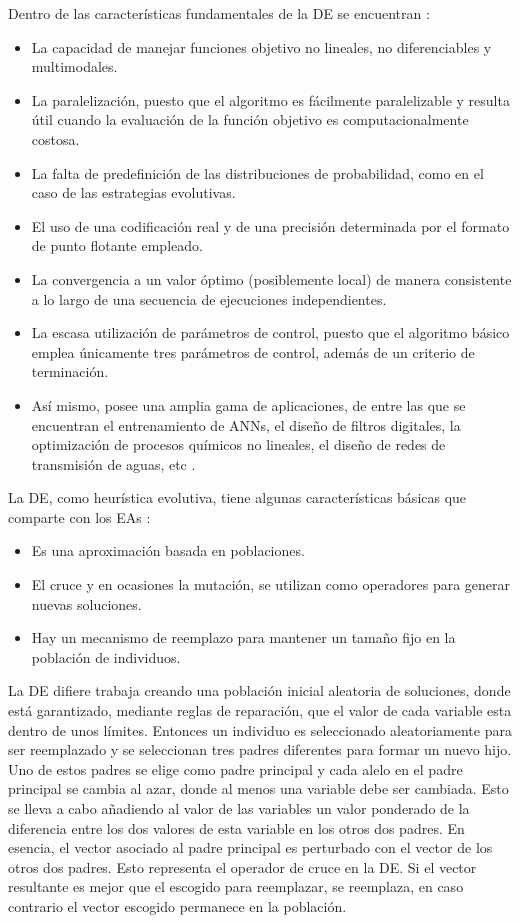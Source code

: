 Dentro de las características fundamentales de la DE se encuentran \cite{Storn1997}:
\begin{itemize}
\item La capacidad de manejar funciones objetivo no lineales, no diferenciables y
multimodales.
\item La paralelización,  puesto  que el algoritmo es fácilmente  paralelizable y resulta
útil  cuando la evaluación de la función objetivo es computacionalmente costosa.
\item La  falta  de  predefinición  de  las  distribuciones  de  probabilidad,  como  en
el  caso  de  las estrategias evolutivas.
\item El uso de una codificación real y de una precisión determinada por el formato de
punto flotante empleado.
\item La  convergencia  a  un  valor  óptimo  (posiblemente  local)  de  manera
consistente  a  lo  largo  de una secuencia de ejecuciones independientes.
\item La  escasa  utilización  de  parámetros  de  control,  puesto  que    el  algoritmo
básico \cite{Storn1997} emplea  únicamente tres parámetros de control, además de un
criterio de terminación.
\item Así  mismo,  posee  una  amplia  gama  de  aplicaciones,  de  entre  las
que se  encuentran  el entrenamiento  de  ANNs,  el  diseño  de  filtros
digitales,  la optimización  de  procesos químicos no lineales, el diseño de redes de
transmisión de aguas, etc \cite{Chakraborty2008}.
\end{itemize}

La DE, como heurística evolutiva, tiene algunas características básicas que comparte con
los EAs \cite{Mezuza2008}:
\begin{itemize}
\item Es una aproximación basada en poblaciones.
\item El cruce y en ocasiones la mutación, se utilizan como operadores para generar nuevas
soluciones.
\item Hay un mecanismo de reemplazo para mantener un tamaño fijo en la población de
individuos.
\end{itemize}

La DE difiere \cite{Storn1997} trabaja creando una población inicial aleatoria de
soluciones, donde está garantizado, mediante reglas de reparación, que el valor de cada
variable esta dentro de unos límites. Entonces un individuo  es seleccionado
aleatoriamente  para  ser reemplazado  y  se seleccionan tres  padres
diferentes para formar un nuevo hijo. Uno de estos padres se elige como padre
principal
y cada alelo en el padre principal se cambia al azar, donde al menos una variable debe ser
cambiada. Esto
se lleva a cabo añadiendo al valor de las variables un valor ponderado de la diferencia
entre los dos valores
de esta variable en los otros dos padres. En esencia, el vector asociado al padre principal es
perturbado con el vector de  los  otros  dos  padres.  Esto representa  el  operador  de  cruce  en
la  DE. Si el  vector  resultante  es mejor  que  el  escogido  para  reemplazar,  se  reemplaza,
en  caso  contrario  el vector  escogido permanece en la población.

